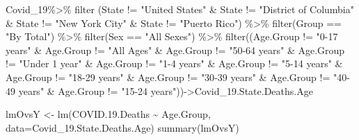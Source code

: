 \documentclass[
]{article}
\newenvironment{Shaded}{\begin{snugshade}}{\end{snugshade}}
\newcommand{\AttributeTok}[1]{\textcolor[rgb]{0.77,0.63,0.00}{#1}}
\newcommand{\FloatTok}[1]{\textcolor[rgb]{0.00,0.00,0.81}{#1}}
\newcommand{\FunctionTok}[1]{\textcolor[rgb]{0.00,0.00,0.00}{#1}}
\newcommand{\NormalTok}[1]{#1}
\newcommand{\OtherTok}[1]{\textcolor[rgb]{0.56,0.35,0.01}{#1}}
\newcommand{\SpecialCharTok}[1]{\textcolor[rgb]{0.00,0.00,0.00}{#1}}
\newcommand{\StringTok}[1]{\textcolor[rgb]{0.31,0.60,0.02}{#1}}
\begin{document}
\begin{Shaded}
\begin{Highlighting}[]
\NormalTok{Covid\_19}\SpecialCharTok{\%\textgreater{}\%}
  \FunctionTok{filter}\NormalTok{ (State }\SpecialCharTok{!=} \StringTok{"United States"} \SpecialCharTok{\&}\NormalTok{ State }\SpecialCharTok{!=} \StringTok{"District of Columbia"} \SpecialCharTok{\&}\NormalTok{ State }\SpecialCharTok{!=} \StringTok{"New York City"} \SpecialCharTok{\&}\NormalTok{ State }\SpecialCharTok{!=} \StringTok{"Puerto Rico"}\NormalTok{) }\SpecialCharTok{\%\textgreater{}\%}
  \FunctionTok{filter}\NormalTok{(Group }\SpecialCharTok{==} \StringTok{"By Total"}\NormalTok{) }\SpecialCharTok{\%\textgreater{}\%}
  \FunctionTok{filter}\NormalTok{(Sex }\SpecialCharTok{==} \StringTok{"All Sexes"}\NormalTok{) }\SpecialCharTok{\%\textgreater{}\%} 
  \FunctionTok{filter}\NormalTok{((Age.Group }\SpecialCharTok{!=} \StringTok{"0{-}17 years"} \SpecialCharTok{\&}\NormalTok{ Age.Group }\SpecialCharTok{!=} \StringTok{"All Ages"} \SpecialCharTok{\&}\NormalTok{ Age.Group }\SpecialCharTok{!=} \StringTok{"50{-}64 years"} \SpecialCharTok{\&}\NormalTok{ Age.Group }\SpecialCharTok{!=} \StringTok{"Under 1 year"} \SpecialCharTok{\&}\NormalTok{ Age.Group }\SpecialCharTok{!=} \StringTok{"1{-}4 years"} \SpecialCharTok{\&}\NormalTok{ Age.Group }\SpecialCharTok{!=} \StringTok{"5{-}14 years"} \SpecialCharTok{\&}\NormalTok{ Age.Group }\SpecialCharTok{!=} \StringTok{"18{-}29 years"} \SpecialCharTok{\&}\NormalTok{ Age.Group }\SpecialCharTok{!=} \StringTok{"30{-}39 years"} \SpecialCharTok{\&}\NormalTok{ Age.Group }\SpecialCharTok{!=} \StringTok{"40{-}49 years"} \SpecialCharTok{\&}\NormalTok{ Age.Group }\SpecialCharTok{!=} \StringTok{"15{-}24 years"}\NormalTok{))}\OtherTok{{-}\textgreater{}}\NormalTok{Covid\_19.State.Deaths.Age}

\NormalTok{lmOvsY }\OtherTok{\textless{}{-}} \FunctionTok{lm}\NormalTok{(COVID.}\FloatTok{19.}\NormalTok{Deaths }\SpecialCharTok{\textasciitilde{}}\NormalTok{ Age.Group, }\AttributeTok{data=}\NormalTok{Covid\_19.State.Deaths.Age)}
\FunctionTok{summary}\NormalTok{(lmOvsY)}
\end{Highlighting}
\end{Shaded}
\end{document}

